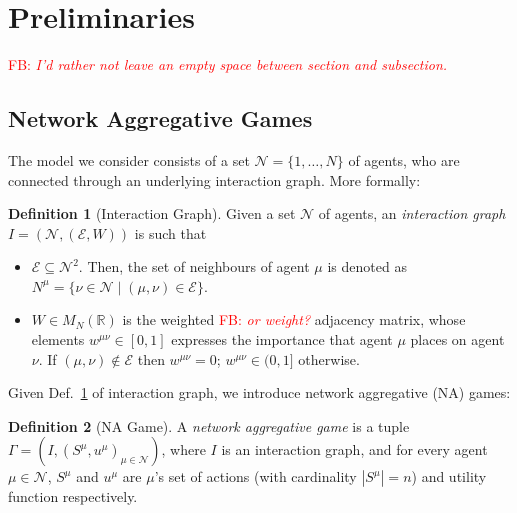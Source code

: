 \documentclass{article}
\theoremstyle{definition}
\newtheorem{definition}{Definition}
\newcommand{\fb}[1]{\textcolor{red}{FB: \textit{#1}}}
\newcommand{\agentset}{\mathcal{N}}
\newcommand{\edgeset}{\mathcal{E}}
\newcommand{\weightset}{W}
\newcommand{\actionset}[1]{S^{#1}}
\newcommand{\utility}[1]{u^{#1}}
\newcommand{\wmunu}{w^{\mu \nu}}
\begin{document}
\section{Preliminaries}

\fb{I'd rather not leave an empty space between section and
  subsection.}

\subsection{Network Aggregative Games}
\label{sec::NAG}

The model we consider consists of
a set $\agentset = \{1,
           \ldots , N \}$ of agents, who are connected through an underlying
           interaction graph.
           More formally:
%        
  \begin{definition}[Interaction Graph] \label{interactiongraph}
    Given a set $\agentset$ of agents, an {\em interaction graph} $I = (\agentset, (\edgeset,
    \weightset))$ is such that
    \begin{itemize}

    \item $\edgeset \subseteq \agentset^2$.  Then, the set of
      neighbours of agent $\mu$ is denoted as $N^\mu = \{\nu \in
      \agentset \mid (\mu, \nu) \in \edgeset\}$.

    \item $\weightset \in M_N(\mathbb{R})$ is the weighted \fb{or weight?} adjacency matrix, whose elements $w^{\mu
        \nu} \in [0, 1]$ expresses the importance that agent $\mu$ places on agent $\nu$. If $(\mu, \nu) \not
        \in \edgeset$ then $w^{\mu \nu} = 0$;        $\wmunu \in (0, 1]$ otherwise.
    \end{itemize}
  \end{definition}

  Given Def.~\ref{interactiongraph} of interaction graph,
  we introduce network aggregative (NA) games:
%
  \begin{definition}[NA Game]
    A {\em network aggregative game} is
a tuple $\Gamma = (I, (\actionset{\mu},
    \utility{\mu})_{\mu \in \mathcal{N}})$, where $I$ is an
    interaction graph, and for every agent $\mu \in \mathcal{N}$, $\actionset{\mu}$ and $\utility{\mu}$
    are $\mu$'s set of actions (with cardinality $|\actionset{\mu}| = n$)
    and utility function respectively.
  \end{definition}
\end{document}
